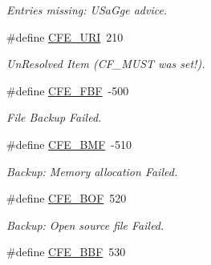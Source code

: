 \begin{CompactItemize}
\begin{CompactList}\small\item\em Entries missing: USaGge advice. \item\end{CompactList}\item 
\hypertarget{group__errors_gd9ced7e6eab277e4e24f511af9daf3bf}{
\#define \hyperlink{group__errors_gd9ced7e6eab277e4e24f511af9daf3bf}{CFE\_\-URI}~210}
\label{group__errors_gd9ced7e6eab277e4e24f511af9daf3bf}

\begin{CompactList}\small\item\em UnResolved Item (CF\_\-MUST was set!). \item\end{CompactList}\item 
\hypertarget{group__errors_g22ceafacdf80ae7247728f05c9129b1e}{
\#define \hyperlink{group__errors_g22ceafacdf80ae7247728f05c9129b1e}{CFE\_\-FBF}~-500}
\label{group__errors_g22ceafacdf80ae7247728f05c9129b1e}

\begin{CompactList}\small\item\em File Backup Failed. \item\end{CompactList}\item 
\hypertarget{group__errors_g722db0752b9a2f977065b8001da18101}{
\#define \hyperlink{group__errors_g722db0752b9a2f977065b8001da18101}{CFE\_\-BMF}~-510}
\label{group__errors_g722db0752b9a2f977065b8001da18101}

\begin{CompactList}\small\item\em Backup: Memory allocation Failed. \item\end{CompactList}\item 
\hypertarget{group__errors_gda14f93a466c819b6286bcf7f85bbbe5}{
\#define \hyperlink{group__errors_gda14f93a466c819b6286bcf7f85bbbe5}{CFE\_\-BOF}~520}
\label{group__errors_gda14f93a466c819b6286bcf7f85bbbe5}

\begin{CompactList}\small\item\em Backup: Open source file Failed. \item\end{CompactList}\item 
\hypertarget{group__errors_g793b92e4f9ea3a7acde0cc0dcf80701f}{
\#define \hyperlink{group__errors_g793b92e4f9ea3a7acde0cc0dcf80701f}{CFE\_\-BBF}~530}
\label{group__errors_g793b92e4f9ea3a7acde0cc0dcf80701f}


\end{CompactItemize}
